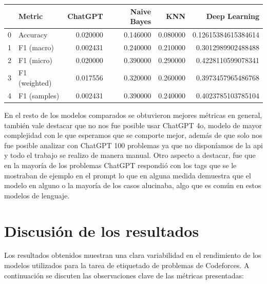 \documentclass{article}
\begin{document}
\begin{tabular}{|l|l|r|r|r|r|}
    \toprule
    {} & Metric        & ChatGPT  & Naive Bayes & KNN      & Deep Learning       \\
    \midrule
    0  & Accuracy      & 0.020000 & 0.146000    & 0.080000 & 0.12615384615384614 \\
    1  & F1 (macro)    & 0.002431 & 0.240000    & 0.210000 & 0.3012989902488488  \\
    2  & F1 (micro)    & 0.020000 & 0.390000    & 0.290000 & 0.4228110599078341  \\
    3  & F1 (weighted) & 0.017556 & 0.320000    & 0.260000 & 0.3973457965486768  \\
    4  & F1 (samples)  & 0.002431 & 0.390000    & 0.240000 & 0.4023785103785104  \\
    \bottomrule
\end{tabular}

En el resto de los modelos comparados se obtuvieron mejores métricas en general, también vale destacar que no nos fue posible
usar ChatGPT 4o, modelo de mayor complejidad con le que esperamos que se comporte mejor, además de que solo nos fue posible 
analizar con ChatGPT 100 problemas ya que no disponíamos de la api y todo el trabajo se realizo de manera manual. Otro aspecto
a destacar, fue que en la mayoría de los problemas ChatGPT respondió  con los tags que se le mostraban de ejemplo en el prompt
lo que en alguna medida demuestra que el modelo en alguno o la mayoría de los casos alucinaba, algo que es común en estos modelos 
de lenguaje.

\section{Discusión de los resultados}
Los resultados obtenidos muestran una clara variabilidad en el rendimiento de los modelos utilizados para la tarea de etiquetado de problemas de Codeforces. A continuación se discuten las observaciones clave de las métricas presentadas:
\end{document}

